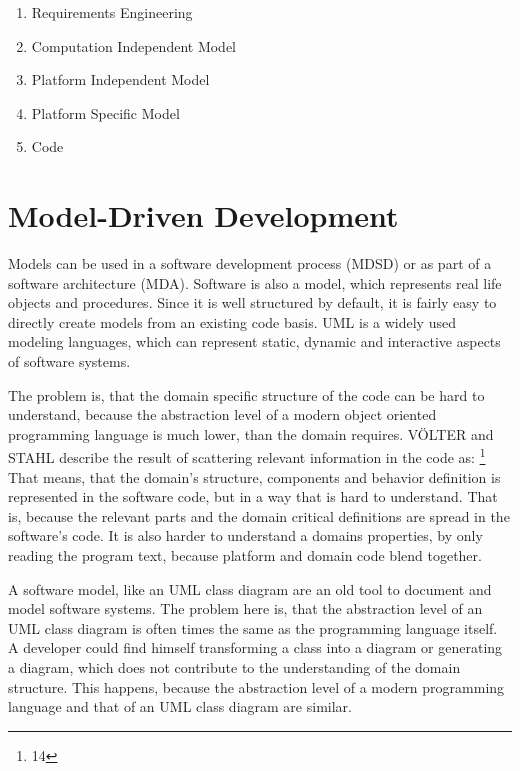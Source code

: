 \begin{enumerate}
	\item Requirements Engineering
	\item Computation Independent Model
	\item Platform Independent Model
	\item Platform Specific Model
	\item Code
\end{enumerate}

\section{Model-Driven Development}

Models can be used in a software development process (\ac{MDSD}) or as part of a software architecture (\ac{MDA}).
Software is also a model, which represents real life objects and procedures.
Since it is well structured by default, it is fairly easy to directly create models from an existing code basis.
\ac{UML} is a widely used modeling languages, which can represent static, dynamic and interactive aspects of software systems.

The problem is, that the domain specific structure of the code can be hard to understand, because the abstraction level of a modern object oriented programming language is much lower, than the domain requires.
\MakeUppercase{Völter} and \MakeUppercase{Stahl} describe the result of scattering relevant information in the code as:
\footnote{\cite{stahl_model-driven_2006} 14}
That means, that the domain's structure, components and behavior definition is represented in the software code, but in a way that is hard to understand.
That is, because the relevant parts and the domain critical definitions are spread in the software's code.
It is also harder to understand a domains properties, by only reading the program text, because platform and domain code blend together.

A software model, like an \ac{UML} class diagram are an old tool to document and model software systems.
The problem here is, that the abstraction level of an \ac{UML} class diagram is often times the same as the programming language itself.
A developer could find himself transforming a class into a diagram or generating a diagram, which does not contribute to the understanding of the domain structure.
This happens, because the abstraction level of a modern programming language and that of an \ac{UML} class diagram are similar.

